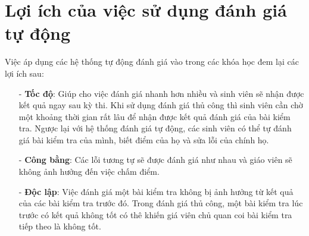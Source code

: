 \documentclass[12pt,a4paper]{article}
\begin{document}
\section{Lợi ích của việc sử dụng đánh giá tự động}
Việc áp dụng các hệ thống tự động đánh giá vào trong các khóa học đem lại các lợi ích sau:
\begin{itemize}
\item[-] \textbf{Tốc độ}: Giúp cho việc đánh giá nhanh hơn nhiều và sinh viên sẽ nhận được kết quả ngay sau kỳ thi. Khi sử dụng đánh giá thủ công thì sinh viên cần chờ một khoảng thời gian rất lâu để nhận được kết quả đánh giá của bài kiểm tra. Ngược lại với hệ thống đánh giá tự động, các sinh viên có thể tự đánh giá bài kiểm tra của mình, biết điểm của họ và sửa lỗi của chính họ.
\item[-] \textbf{Công bằng}: Các lỗi tương tự sẽ được đánh giá như nhau và giáo viên sẽ không ảnh hưởng đến việc chấm điểm.
\item[-] \textbf{Độc lập}: Việc đánh giá một bài kiểm tra không bị ảnh hưởng từ kết quả của các bài kiểm tra trước đó. Trong đánh giá thủ công, một bài kiểm tra lúc trước có kết quả không tốt có thê khiến giá viên chủ quan coi bài kiểm tra tiếp theo là không tốt.
\end{itemize}
\end{document}
